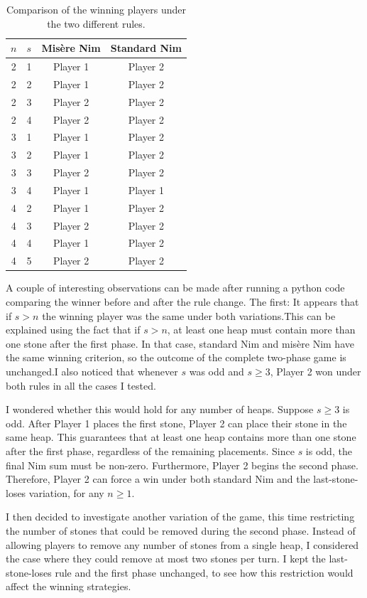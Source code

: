 \documentclass[11pt]{article}
\newcommand{\keywordfont}{\textsc}
\newcommand{\keyword}[1]{%
  \marginpar{\raggedright\small\keywordfont{#1}}}
\begin{document}
\begin{table}[h]
\centering
\begin{tabular}{|c|c|c|c|}
\hline
$n$ & $s$ & Mis\`ere Nim & Standard Nim \\
\hline
2 & 1 & Player 1 & Player 2 \\
2 & 2 & Player 1 & Player 2 \\
2 & 3 & Player 2 & Player 2 \\
2 & 4 & Player 2 & Player 2 \\
3 & 1 & Player 1 & Player 2 \\
3 & 2 & Player 1 & Player 2 \\
3 & 3 & Player 2 & Player 2 \\
3 & 4 & Player 1 & Player 1 \\
4 & 2 & Player 1 & Player 2 \\
4 & 3 & Player 2 & Player 2 \\
4 & 4 & Player 1 & Player 2 \\
4 & 5 & Player 2 & Player 2 \\

\hline
\end{tabular}
\caption{Comparison of the winning players
under the two different rules.}
\end{table}

\keyword{OBSERVE}
A couple of interesting observations can be made after running a python code comparing the winner before and after the rule change. The first: It appears that if $s>n$ the winning player was the same under both
variations.This can be explained using the fact that if $s>n$, at least one heap
must contain more than one stone after the
first phase. In that case, standard Nim and
mis\`ere Nim have the same winning criterion, so the outcome of the complete two-phase game is unchanged.I also noticed that whenever $s$ was odd and $s\geq 3$, Player 2 won under both rules in
all the cases I tested. 


\keyword{IDEA}
I wondered whether this would hold for
any number of heaps.
Suppose $s\geq 3$ is odd. After Player 1
places the first stone, Player 2 can place
their stone in the same heap.
This guarantees that at least one heap
contains more than one stone after the
first phase, regardless of the remaining
placements. Since $s$ is odd, the final Nim sum must be non-zero. Furthermore, Player 2 begins the second phase.
Therefore, Player 2 can force a win under
both standard Nim and the last-stone-loses
variation, for any $n\geq 1$.

\medskip
\keyword{EXTENSION}
I then decided to investigate another variation of the game, this time restricting the number of stones that could be removed during the second phase.
Instead of allowing players to remove any
number of stones from a single heap, I
considered the case where they could remove
at most two stones per turn.
I kept the last-stone-loses rule and the
first phase unchanged, to see how this
restriction would affect the winning strategies.
\end{document}
